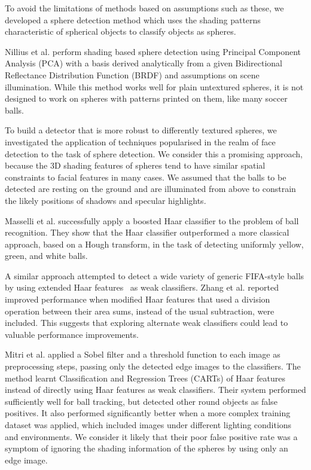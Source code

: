\documentclass{sig-alternate-05-2015}
\newcommand{\citep}[1]{\cite{#1}}
\newcommand{\citet}[1]{\cite{#1}}
\begin{document}
{		To avoid the limitations of methods based on assumptions such as these, we developed a sphere detection method which uses the shading patterns characteristic of spherical objects to classify objects as spheres.

		Nillius et al. \citet{nillius2008shading} perform shading based sphere detection using Principal Component Analysis (PCA) with a basis derived analytically from a given Bidirectional Reflectance Distribution Function (BRDF) and assumptions on scene illumination. While this method works well for plain untextured spheres, it is
		not designed to work on spheres with patterns printed on them, like many soccer balls.

		To build a detector that is more robust to differently textured spheres, we investigated the application of techniques popularised in the realm of face detection to the task of sphere detection. We consider this a promising approach, because the 3D shading features of spheres tend to have similar spatial constraints to facial features in many cases. We assumed that the balls to be detected are resting on the ground and are illuminated from above to constrain the likely positions of shadows and specular highlights.



		Masselli et al. \citet{masselli2013haar} successfully apply a boosted Haar classifier \citep{viola2001robust} to the problem of ball recognition. They show that the Haar classifier outperformed a more classical approach, based on a Hough transform, in the task of detecting uniformly yellow, green, and white balls.

		A similar approach	\citet{zhang2013novel} attempted to detect a wide variety of generic FIFA-style balls by using extended Haar features~\citep{Lienhart2002extended} as weak classifiers. Zhang et al. \citet{zhang2013novel} reported improved performance when modified Haar features that used a division operation between their area sums, instead of the usual subtraction, were included. This suggests that exploring alternate weak classifiers could lead to valuable performance improvements.

		Mitri et al. \citet{mitri2004fast} applied a Sobel filter and a threshold function to each image as preprocessing steps, passing only the detected edge images to the classifiers. The method learnt Classification and Regression Trees (CARTs) of Haar features instead of directly using Haar features as weak classifiers. Their system performed sufficiently well for ball tracking, but detected other round objects as false positives. It also performed significantly better when a more complex training dataset was applied, which included images under different lighting conditions and environments. We consider it likely that their poor false positive rate was a symptom of ignoring the shading information of the spheres by using only an edge image.

}
\end{document}
